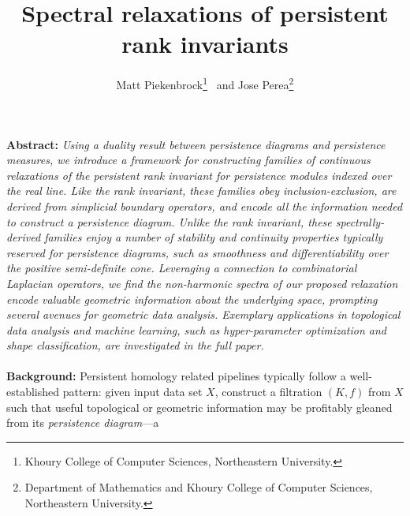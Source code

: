 \documentclass[10pt twocolumn]{article}
\title{\vspace{-2.0em} 
Spectral relaxations of persistent rank invariants
\vspace{-0.5em}}
\author{Matt Piekenbrock\thanks{Khoury College of Computer Sciences, Northeastern University.} \, and Jose Perea\thanks{Department of Mathematics and Khoury College of Computer Sciences, Northeastern University.}}
\date{}
\numberwithin{equation}{section}
\newcommand{\+}{%
	\raisebox{0.18ex}{\scaleobj{0.55}{+}}
}
\theoremstyle{definition}
\theoremstyle{definition}
\begin{document}
\begin{multicols}{2}
\maketitle
\noindent
\textbf{Abstract:} \emph{Using a duality result between persistence diagrams and persistence measures, we introduce a framework for constructing families of continuous relaxations of the persistent rank invariant for persistence modules indexed over the real line. 
Like the rank invariant, these families obey inclusion-exclusion, are derived from simplicial boundary operators, and encode all the information needed to construct a persistence diagram. 
Unlike the rank invariant, these spectrally-derived families enjoy a number of stability and continuity properties typically reserved for persistence diagrams, such as smoothness and differentiability over the positive semi-definite cone. 
Leveraging a connection to combinatorial Laplacian operators, we find the non-harmonic spectra of our proposed relaxation encode valuable geometric information about the underlying space, prompting several avenues for geometric data analysis.
Exemplary applications in topological data analysis and machine learning, such as hyper-parameter optimization and shape classification, are investigated in the full paper.
}
\\
\\
\noindent \textbf{Background:} Persistent homology related pipelines typically follow a well-established pattern: given input data set $X$, construct a filtration $(K, f)$ from $X$ such that useful topological or geometric information may be profitably gleaned from its \emph{persistence diagram}---a 

\end{multicols}
\end{document}
